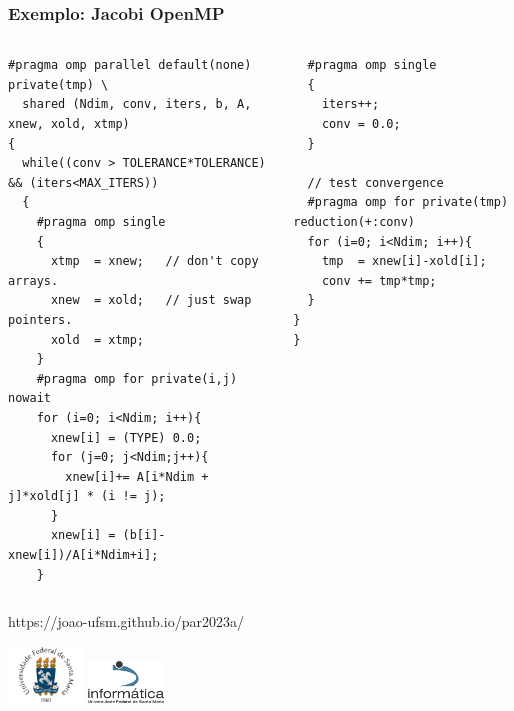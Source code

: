 \documentclass[xcolor={usenames,dvipsnames},12pt,presentation,aspectratio=169]{beamer}
\begin{document}
\begin{frame}[fragile]
  \frametitle{Exemplo: Jacobi OpenMP}
%
\begin{columns}
  \begin{column}{0.6\textwidth} 
\begin{minipage}{0.95\textwidth}  
\begin{verbatim} 
#pragma omp parallel default(none) private(tmp) \
  shared (Ndim, conv, iters, b, A, xnew, xold, xtmp) 
{
  while((conv > TOLERANCE*TOLERANCE) && (iters<MAX_ITERS))
  {
    #pragma omp single
    {
      xtmp  = xnew;   // don't copy arrays.
      xnew  = xold;   // just swap pointers.
      xold  = xtmp;
    }
    #pragma omp for private(i,j) nowait
    for (i=0; i<Ndim; i++){
      xnew[i] = (TYPE) 0.0;
      for (j=0; j<Ndim;j++){
        xnew[i]+= A[i*Ndim + j]*xold[j] * (i != j);
      }
      xnew[i] = (b[i]-xnew[i])/A[i*Ndim+i];
    }
\end{verbatim}
  \end{minipage}    
  \end{column}
  \begin{column}{0.4\textwidth}
\begin{minipage}{0.95\textwidth}  
\begin{verbatim} 
  #pragma omp single
  {
    iters++;
    conv = 0.0;
  }

  // test convergence
  #pragma omp for private(tmp) reduction(+:conv)
  for (i=0; i<Ndim; i++){
    tmp  = xnew[i]-xold[i];
    conv += tmp*tmp;
  }
}
}
\end{verbatim}
  \end{minipage}      
  \end{column}
\end{columns}
%
\end{frame}
\begin{frame}[plain]{}
  \begin{center}
    \vspace{2cm}
    \Large{https://joao-ufsm.github.io/par2023a/}
    
    \vspace{1cm}
    \includegraphics[width=2cm]{logo_ufsm}
    \hspace{0.5cm}
    \includegraphics[width=2cm]{logo_inf}
  \end{center}
\end{frame}
\end{document}

